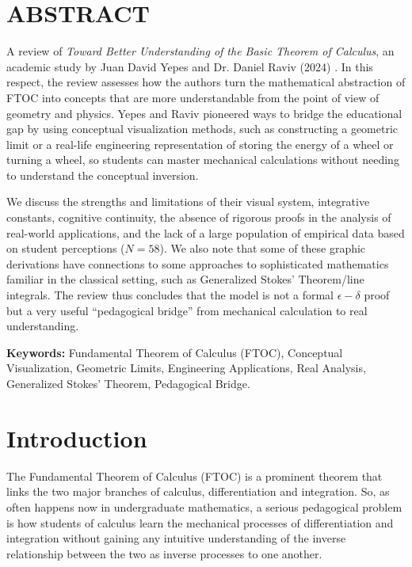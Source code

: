 \documentclass[11pt, a4paper]{article}
\begin{document}
\newpage
\section*{ABSTRACT}
A review of \textit{Toward Better Understanding of the Basic Theorem of Calculus}, an academic study by Juan David Yepes and Dr. Daniel Raviv (2024) \cite{Yepes2024}. In this respect, the review assesses how the authors turn the mathematical abstraction of FTOC into concepts that are more understandable from the point of view of geometry and physics. Yepes and Raviv pioneered ways to bridge the educational gap by using conceptual visualization methods, such as constructing a geometric limit or a real-life engineering representation of storing the energy of a wheel or turning a wheel, so students can master mechanical calculations without needing to understand the conceptual inversion.

We discuss the strengths and limitations of their visual system, integrative constants, cognitive continuity, the absence of rigorous proofs in the analysis of real-world applications, and the lack of a large population of empirical data based on student perceptions ($N=58$). We also note that some of these graphic derivations have connections to some approaches to sophisticated mathematics familiar in the classical setting, such as Generalized Stokes' Theorem/line integrals. The review thus concludes that the model is not a formal $\epsilon-\delta$ proof but a very useful ``pedagogical bridge'' from mechanical calculation to real understanding.

\vspace{1em}
\noindent\textbf{Keywords:} Fundamental Theorem of Calculus (FTOC), Conceptual Visualization, Geometric Limits, Engineering Applications, Real Analysis, Generalized Stokes' Theorem, Pedagogical Bridge.

\newpage
\tableofcontents
\newpage


\section{Introduction}
\label{sec:intro}
The Fundamental Theorem of Calculus (FTOC) is a prominent theorem that links the two major branches of calculus, differentiation and integration. So, as often happens now in undergraduate mathematics, a serious pedagogical problem is how students of calculus learn the mechanical processes of differentiation and integration without gaining any intuitive understanding of the inverse relationship between the two as inverse processes to one another.
\end{document}

